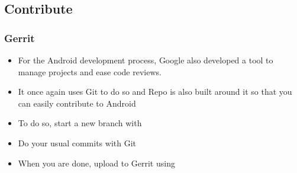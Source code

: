 \subsection{Contribute}
\begin{frame}
  \frametitle{Gerrit}
  \begin{itemize}
  \item For the Android development process, Google also developed a
    tool to manage projects and ease code reviews.
  \item It once again uses Git to do so and Repo is also built around
    it so that you can easily contribute to Android
  \item To do so, start a new branch with 
  \item Do your usual commits with Git
  \item When you are done, upload to Gerrit using 
  \end{itemize}
\end{frame}
